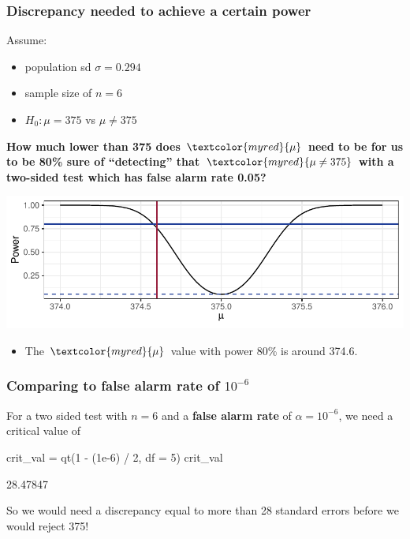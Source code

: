 \documentclass[a4paper]{article}
\begin{document}
\subsubsection{Discrepancy needed to achieve a certain power}
Assume:
\begin{itemize}
	\item population sd \( \sigma = 0.294 \) 
	\item sample size of \( n = 6 \)
	\item \( H_0: \mu = 375 \) vs \( \mu \neq 375 \) 
\end{itemize}
\begin{greenbox}
	\textbf{How much lower than 375 does \( \textcolor{myred}{\mu} \) need to be for us to be 80\% sure of ``detecting'' that \( \textcolor{myred}{\mu \neq 375} \) with a two-sided test which has false alarm rate 0.05?}
\end{greenbox}
\begin{Schunk}


{\centering \includegraphics[width=\maxwidth]{figure/listings-unnamed-chunk-95-1} 

}

\end{Schunk}
\begin{itemize}
	\item The \( \textcolor{myred}{\mu} \) value with power 80\% is around 374.6.
\end{itemize}
\subsubsection{Comparing to false alarm rate of \( 10^{-6} \)}
For a two sided test with \( n = 6 \) and a \textbf{false alarm rate} of \( \alpha = 10^{-6} \), we need a critical value of
\begin{Schunk}
\begin{Sinput}
crit_val = qt(1 - (1e-6) / 2, df = 5)
crit_val
\end{Sinput}
\begin{Soutput}
[1] 28.47847
\end{Soutput}
\end{Schunk}
So we would need a discrepancy equal to more than 28 standard errors before we would reject 375!
\end{document}
